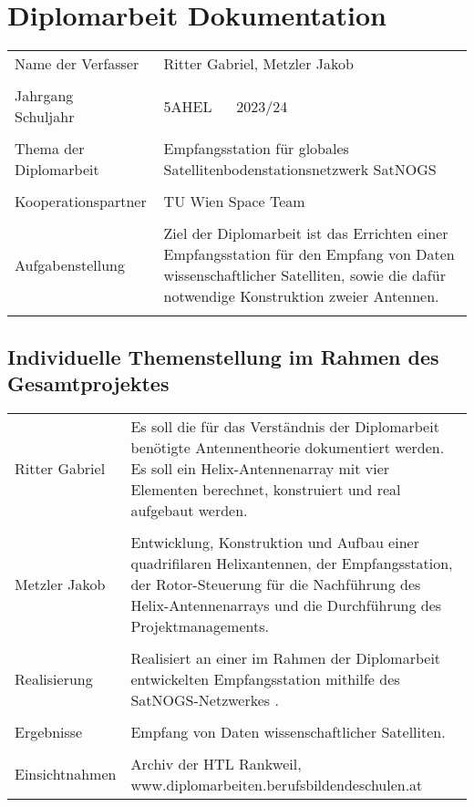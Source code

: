 \section *{Diplomarbeit Dokumentation}


\begin{tabular}{@{}p{5cm}p{8cm}}
	Name der Verfasser & Ritter Gabriel, Metzler Jakob \\ & \\
	
	Jahrgang ~\textbar~ Schuljahr & 5AHEL ~\textbar~ 2023/24\\ & \\
	
	Thema der Diplomarbeit & Empfangsstation für globales Satellitenbodenstationsnetzwerk SatNOGS \\ & \\
	
	Kooperationspartner & TU Wien Space Team \cite{noauthor_sts1_nodate} \\ & \\
	
	Aufgabenstellung & Ziel der Diplomarbeit ist das Errichten einer Empfangsstation für den Empfang von Daten wissenschaftlicher Satelliten, sowie die dafür notwendige Konstruktion zweier Antennen. \\ & \\
\end{tabular}

\pagebreak

\subsection *{Individuelle Themenstellung im Rahmen des Gesamtprojektes}
\begin{tabular}{@{}p{5cm}p{8cm}}
	
	Ritter Gabriel & Es soll die für das Verständnis der Diplomarbeit benötigte Antennentheorie dokumentiert werden. Es soll ein Helix-Antennenarray mit vier Elementen berechnet, konstruiert und real aufgebaut werden. \\ & \\
	
	Metzler Jakob & Entwicklung, Konstruktion und Aufbau einer quadrifilaren Helixantennen, der Empfangsstation, der Rotor-Steuerung für die Nachführung des Helix-Antennenarrays und die Durchführung des Projektmanagements.  \\ & \\
	
	Realisierung & Realisiert an einer im Rahmen der Diplomarbeit entwickelten Empfangsstation mithilfe des SatNOGS-Netzwerkes \cite{noauthor_satnogshomepage_nodate}. \\ & \\
	
	Ergebnisse & Empfang von Daten wissenschaftlicher Satelliten.\\ & \\
	
	Einsichtnahmen & Archiv der HTL Rankweil, \newline www.diplomarbeiten.berufsbildendeschulen.at \\
\end{tabular}
